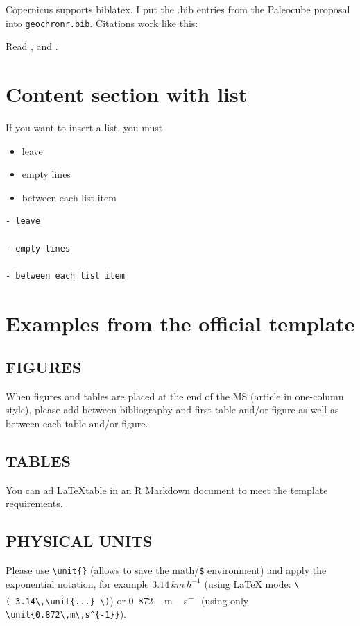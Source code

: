 \documentclass[gc, manuscript]{copernicus}
\begin{document}
Copernicus supports biblatex. I put the .bib entries from the Paleocube proposal into \texttt{geochronr.bib}. Citations work like this:

Read \citep{Evans_QSR13}, and \citep[see][]{PRYSM}.

\section{Content section with list}

If you want to insert a list, you must

\begin{itemize}
\item
  leave
\item
  empty lines
\item
  between each list item
\end{itemize}

\begin{verbatim}
- leave

- empty lines

- between each list item
\end{verbatim}

\section{Examples from the official template}

\subsection{FIGURES}

When figures and tables are placed at the end of the MS (article in one-column style), please add \clearpage between bibliography and first table and/or figure as well as between each table and/or figure.

\subsection{TABLES}

You can ad \LaTeX table in an R Markdown document to meet the template requirements.

\subsection{PHYSICAL UNITS}

Please use \texttt{\textbackslash{}unit\{\}} (allows to save the math/\texttt{\$} environment) and apply the exponential notation, for example \(3.14\,\unit{km\,h^{-1}}\) (using LaTeX mode: \texttt{\textbackslash{}(\ 3.14\textbackslash{},\textbackslash{}unit\{...\}\ \textbackslash{})}) or \unit{0.872\,m\,s^{-1}} (using only \texttt{\textbackslash{}unit\{0.872\textbackslash{},m\textbackslash{},s\^{}\{-1\}\}}).
\end{document}
